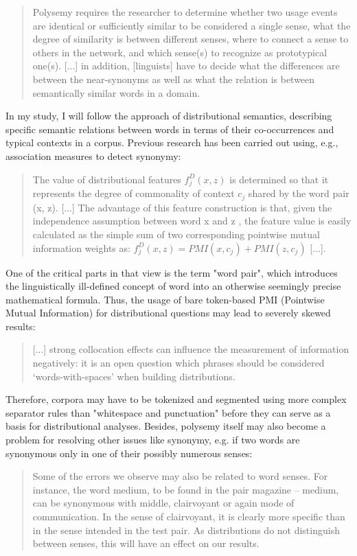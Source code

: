 \documentclass[jou]{apa6} %
\begin{document}
\blockquote[{\cite[p.~274]{divjakCorpusbasedCognitiveSemantics2009}}]{Polysemy requires the researcher to determine whether two usage events are identical or sufficiently similar to be considered a single sense, what the degree of similarity is between different senses, where to connect a sense to others in the network, and which sense(s) to recognize as prototypical one(s). [...] in addition, [linguists] have to decide what the differences are between the near-synonyms as well as what the relation is between semantically similar words in a domain.}
In my study, I will follow the approach of distributional semantics, describing specific semantic relations between words in terms of their co-occurrences and typical contexts in a corpus. Previous research has been carried out using, e.g., association measures to detect synonymy:
\blockquote[{\cite[p.~566]{hagiwaraSupervisedSynonymAcquisition2009}}]{The value of distributional features \( f_j^D (x, z) \) is determined so that it represents the degree of commonality of context \( c_j \) shared by the word pair (x, z). [...] The advantage of this feature construction is that, given the independence assumption between word x and z , the feature value is easily calculated as the simple sum of two corresponding pointwise mutual information weights as: \( f_j^D (x, z) = PMI(x, c_j) + PMI(z, c_j) \) [...].}
One of the critical parts in that view is the term "word pair", which introduces the linguistically ill-defined concept of word into an otherwise seemingly precise mathematical formula. Thus, the usage of bare token-based PMI (Pointwise Mutual Information) for distributional questions may lead to severely skewed results:
\blockquote[{\cite[p.~444]{herbelotMeasuringSemanticContent2013}}]{[...] strong collocation effects can influence the measurement of information negatively: it is an open question which phrases should be considered ‘words-with-spaces’ when building distributions.}
Therefore, corpora may have to be tokenized and segmented using more complex separator rules than "whitespace and punctuation" before they can serve as a basis for distributional analyses. Besides, polysemy itself may also become a problem for resolving other issues like synonymy, e.g. if two words are synonymous only in one of their possibly numerous senses:
\blockquote[{\cite[p.~444]{herbelotMeasuringSemanticContent2013}}]{Some of the errors we observe may also be related to word senses. For instance, the word medium, to be found in the pair magazine – medium, can be synonymous with middle, clairvoyant or again mode of communication. In the sense of clairvoyant, it is clearly more specific than in the sense intended in the test pair. As distributions do not distinguish between senses, this will have an effect on our results.}
\end{document}
